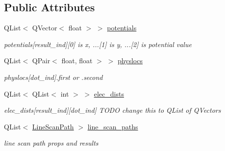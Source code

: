\subsection*{Public Attributes}
\begin{DoxyCompactItemize}
\item 
Q\+List$<$ Q\+Vector$<$ float $>$ $>$ \hyperlink{classprim_1_1SimJob_afbf4652d041350b91f22fd20e9f6db78}{potentials}\hypertarget{classprim_1_1SimJob_afbf4652d041350b91f22fd20e9f6db78}{}\label{classprim_1_1SimJob_afbf4652d041350b91f22fd20e9f6db78}

\begin{DoxyCompactList}\small\item\em potentials\mbox{[}result\+\_\+ind\mbox{]}\mbox{[}0\mbox{]} is x, ...\mbox{[}1\mbox{]} is y, ...\mbox{[}2\mbox{]} is potential value \end{DoxyCompactList}\item 
Q\+List$<$ Q\+Pair$<$ float, float $>$ $>$ \hyperlink{classprim_1_1SimJob_ab4cd1225ddbeac6a120de029f6995191}{physlocs}\hypertarget{classprim_1_1SimJob_ab4cd1225ddbeac6a120de029f6995191}{}\label{classprim_1_1SimJob_ab4cd1225ddbeac6a120de029f6995191}

\begin{DoxyCompactList}\small\item\em physlocs\mbox{[}dot\+\_\+ind\mbox{]}.first or .second \end{DoxyCompactList}\item 
Q\+List$<$ Q\+List$<$ int $>$ $>$ \hyperlink{classprim_1_1SimJob_a376f3cdc76baec24fc0d4c2d79d1fbab}{elec\+\_\+dists}\hypertarget{classprim_1_1SimJob_a376f3cdc76baec24fc0d4c2d79d1fbab}{}\label{classprim_1_1SimJob_a376f3cdc76baec24fc0d4c2d79d1fbab}

\begin{DoxyCompactList}\small\item\em elec\+\_\+dists\mbox{[}result\+\_\+ind\mbox{]}\mbox{[}dot\+\_\+ind\mbox{]} T\+O\+DO change this to Q\+List of Q\+Vectors \end{DoxyCompactList}\item 
Q\+List$<$ \hyperlink{structprim_1_1SimJob_1_1LineScanPath}{Line\+Scan\+Path} $>$ \hyperlink{classprim_1_1SimJob_a40d30627d5e869b21d939a06d53a0c1f}{line\+\_\+scan\+\_\+paths}\hypertarget{classprim_1_1SimJob_a40d30627d5e869b21d939a06d53a0c1f}{}\label{classprim_1_1SimJob_a40d30627d5e869b21d939a06d53a0c1f}

\begin{DoxyCompactList}\small\item\em line scan path props and results \end{DoxyCompactList}\end{DoxyCompactItemize}


